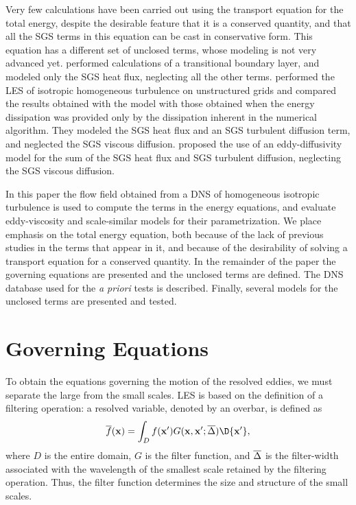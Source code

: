 \documentclass[tcfd]{svjour}
\begin{document}
Very few calculations have been carried out using the transport equation
for the total energy, despite the desirable feature that it is a
conserved quantity, and that all the SGS terms in this equation can be
cast in conservative form. This equation has a different set of unclosed
terms, whose modeling is not very advanced yet. \citet{nor92} performed
calculations of a transitional boundary layer, and modeled only the SGS
heat f\/lux, neglecting all the other terms. \citet{kni98} performed the
LES of isotropic homogeneous turbulence on unstructured grids and
compared the results obtained with the \citet{sma63} model with those
obtained when the energy dissipation was provided only by the
dissipation inherent in the numerical algorithm. They modeled the SGS
heat f\/lux and an SGS turbulent diffusion term, and neglected the SGS
viscous diffusion. \citet{com98} proposed the use of an eddy-diffusivity
model for the sum of the SGS heat f\/lux and SGS turbulent diffusion,
neglecting the SGS viscous diffusion.

In this paper the f\/low f\/ield obtained from a DNS of homogeneous
isotropic turbulence is used to compute the terms in the energy
equations, and evaluate eddy-viscosity and scale-similar models for
their parametrization. We place emphasis on the total energy equation,
both because of the lack of previous studies in the terms that appear in
it, and because of the desirability of solving a transport equation for
a conserved quantity. In the remainder of the paper the governing
equations are presented and the unclosed terms are def\/ined. The DNS
database used for the {\it a priori} tests is described. Finally,
several models for the unclosed terms are presented and tested.


\section{Governing Equations}
\label{sec:2}

To obtain the equations governing the motion of the resolved eddies,
we must separate the large from the small scales. LES is based on the
def\/inition of a f\/iltering operation: a resolved variable, denoted by
an overbar, is def\/ined as \citep{leo74}
\begin{equation}
 \overline{f}({\bf x}) = \int_D f({\bf x'})
 G({\bf x},{\bf x'};\delbar)
 \D{\bf x'},
 \label{eq:filtering}
\end{equation}
where $D$ is the entire domain, $G$ is the f\/ilter function, and
$\overline{\Delta}$ is the f\/ilter-width associated with the wavelength of the
smallest scale retained by the f\/iltering operation. Thus, the f\/ilter
function determines the size and structure of the small scales.
\end{document}
